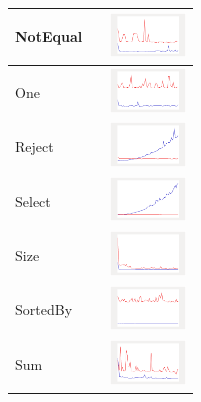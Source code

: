 \begin{longtable}{ m{2.5cm} m{8cm} m{2cm} }
NotEqual &

&
\includegraphics[width=2cm]{graphs/bag/small/NEQ}
\\\hline

One &

&
\includegraphics[width=2cm]{graphs/bag/small/One}
\\\hline

Reject &

&
\includegraphics[width=2cm]{graphs/bag/small/Reject}
\\\hline

Select &

&
\includegraphics[width=2cm]{graphs/bag/small/Select}
\\\hline

Size &

&
\includegraphics[width=2cm]{graphs/bag/small/Size}
\\\hline

SortedBy &

&
\includegraphics[width=2cm]{graphs/bag/small/sortedBy}
\\\hline

Sum &

&
\includegraphics[width=2cm]{graphs/bag/small/Sum}
\\\hline
 

\end{longtable}
